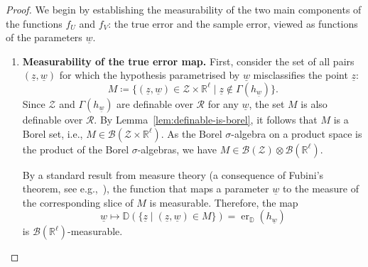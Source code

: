 \begin{proof}
    We begin by establishing the measurability of the two main components of the functions $f_U$ and $f_V$: the true error and the sample error, viewed as functions of the parameters $\underline{w}$.

    \begin{enumerate}
        \item \textbf{Measurability of the true error map.}
        First, consider the set of all pairs $(\underline{z}, \underline{w})$ for which the hypothesis parametrised by $\underline{w}$ misclassifies the point $\underline{z}$:
        \[
            M \coloneqq \{(\underline{z}, \underline{w}) \in \mathcal{Z} \times \mathbb{R}^\ell \mid \underline{z} \notin \Gamma(h_{\underline{w}}) \}.
        \]
        Since $\mathcal{Z}$ and $\Gamma(h_{\underline{w}})$ are definable over $\mathcal{R}$ for any $\underline{w}$, the set $M$ is also definable over $\mathcal{R}$. By Lemma~\ref{lem:definable-is-borel}, it follows that $M$ is a Borel set, i.e., $M \in \mathcal{B}(\mathcal{Z} \times \mathbb{R}^\ell)$. As the Borel $\sigma$-algebra on a product space is the product of the Borel $\sigma$-algebras, we have $M \in \mathcal{B}(\mathcal{Z}) \otimes \mathcal{B}(\mathbb{R}^\ell)$.

        By a standard result from measure theory (a consequence of Fubini's theorem, see e.g.,~\cite[Proposition 3.3.2]{Bogachev2007}), the function that maps a parameter $\underline{w}$ to the measure of the corresponding slice of $M$ is measurable. Therefore, the map
        \[
            \underline{w} \mapsto \mathbb{D}(\{\underline{z} \mid (\underline{z}, \underline{w}) \in M\}) = \operatorname{er}_{\mathbb{D}}(h_{\underline{w}})
        \]
        is $\mathcal{B}(\mathbb{R}^\ell)$-measurable.


\end{enumerate}
\end{proof}
